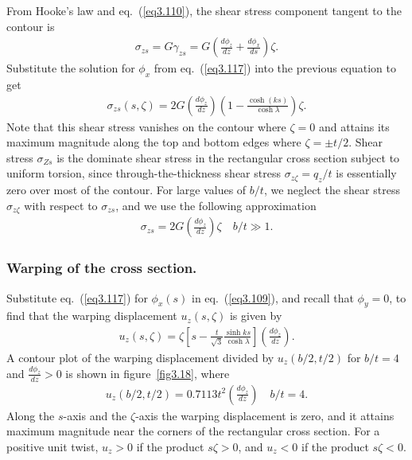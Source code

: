 \documentclass{AeroStructure-ERJohnson}
\begin{document}
From Hooke's law and eq.~(\ref{eq3.110}), the shear stress component tangent to the contour is
\begin{align*}
\sigma_{z s}=G \gamma_{z s}=G\left(\frac{d \phi_{z}}{d z}+\frac{d \phi_{x}}{d s}\right) \zeta.
\end{align*}
Substitute the solution for $\phi_{x}$ from eq.~(\ref{eq3.117}) into the previous equation to get
\begin{align}\label{eq3.124}
\sigma_{z s}(s, \zeta)=2 G\left(\frac{d \phi_{z}}{d z}\right)\left(1-\frac{\cosh (k s)}{\cosh \lambda}\right) \zeta.
\end{align}
Note that this shear stress vanishes on the contour where $\zeta=0$ and attains its maximum magnitude along the top and bottom edges where $\zeta=\pm t / 2$. Shear stress $\sigma_{Z s}$ is the dominate shear stress in the rectangular cross section subject to uniform torsion, since through-the-thickness shear stress $\sigma_{z \zeta}=q_{z} / t$ is essentially zero over most of the contour. For large values of $b/t$, we neglect the shear stress $\sigma_{z \zeta}$ with respect to $\sigma_{z s}$, and we use the following approximation
\begin{align}\label{eq3.125}
\sigma_{z s}=2 G\left(\frac{d \phi_{z}}{d z}\right) \zeta \quad b / t \gg 1.
\end{align}

\vspace*{-1pc}

\subsubsection{Warping of the cross section.} Substitute eq.~(\ref{eq3.117}) for $\phi_{x}(s)$ in eq.~(\ref{eq3.109}), and recall that $\phi_{y}=0$, to find that the warping displacement $u_{z}(s, \zeta)$ is given by
\begin{align}\label{eq3.126}
u_{z}(s, \zeta)=\zeta\left[s-\frac{t}{\sqrt{3}} \frac{\sinh k s}{\cosh \lambda}\right]\left(\frac{d \phi_{z}}{d z}\right).
\end{align}
\noindent A contour plot of the warping displacement divided by $u_{z}(b / 2, t / 2)$ for $b / t=4$ and $\frac{d \phi_{z}}{d z}>0$ is shown in figure~\ref{fig3.18}, where
\begin{align*}
u_{z}(b / 2, t / 2)=0.7113 t^{2}\left(\frac{d \phi_{z}}{d z}\right) \quad b / t=4.
\end{align*}
\noindent Along the $s$-axis and the $\zeta$-axis the warping displacement is zero, and it attains maximum magnitude near the corners of the rectangular cross section. For a positive unit twist, $u_{z}>0$ if the product $s \zeta>0$, and $u_{z}<0$ if the product $s \zeta<0$.
\end{document}
